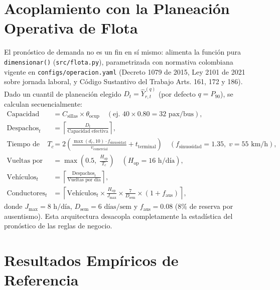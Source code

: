 \documentclass[11pt,a4paper]{article}
\begin{document}
\section{Acoplamiento con la Planeación Operativa de Flota}

El pronóstico de demanda no es un fin en sí mismo: alimenta la función pura \texttt{dimensionar()} (\texttt{src/flota.py}), parametrizada con normativa colombiana vigente en \texttt{configs/operacion.yaml} (Decreto 1079 de 2015, Ley 2101 de 2021 sobre jornada laboral, y Código Sustantivo del Trabajo Arts. 161, 172 y 186). Dado un cuantil de planeación elegido $D_t = \hat{Y}^{(q)}_{r,t}$ (por defecto $q = P_{90}$), se calculan secuencialmente:
\begin{align*}
\text{Capacidad efectiva} &= C_{\text{sillas}} \times \theta_{\text{ocup}} \quad (\text{ej. } 40 \times 0.80 = 32\text{ pax/bus}), \\
\text{Despachos}_t &= \left\lceil \frac{D_t}{\text{Capacidad efectiva}} \right\rceil, \\
\text{Tiempo de ciclo } T_c &= 2 \left( \frac{\max(d_r, 10) \cdot f_{\text{sinuosidad}}}{v_{\text{comercial}}} + t_{\text{terminal}} \right) \quad (f_{\text{sinuosidad}} = 1.35,\; v = 55\text{ km/h}), \\
\text{Vueltas por día} &= \max\!\left(0.5,\; \frac{H_{\text{op}}}{T_c}\right) \quad (H_{\text{op}} = 16\text{ h/día}), \\
\text{Vehículos}_t &= \left\lceil \frac{\text{Despachos}_t}{\text{Vueltas por día}} \right\rceil, \\
\text{Conductores}_t &= \left\lceil \text{Vehículos}_t \times \frac{H_{\text{op}}}{J_{\max}} \times \frac{7}{D_{\text{sem}}} \times (1 + f_{\text{aus}}) \right\rceil,
\end{align*}
donde $J_{\max} = 8\text{ h/día}$, $D_{\text{sem}} = 6\text{ días/sem}$ y $f_{\text{aus}} = 0.08$ ($8\%$ de reserva por ausentismo). Esta arquitectura desacopla completamente la estadística del pronóstico de las reglas de negocio.

\section{Resultados Empíricos de Referencia}
\end{document}
